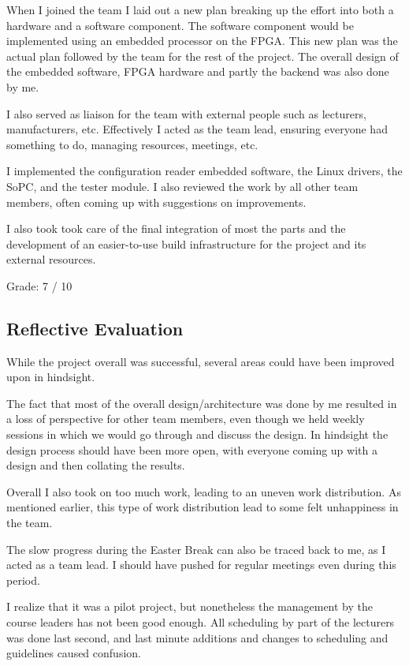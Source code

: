 \documentclass[a4paper,10pt]{article}
\begin{document}
When I joined the team I laid out a new plan breaking up the effort into both
a hardware and a software component. The software component would be implemented
using an embedded processor on the FPGA. This new plan was the actual plan followed
by the team for the rest of the project. The overall design of the embedded software,
FPGA hardware and partly the backend was also done by me.

I also served as liaison for the team with external people such as lecturers,
manufacturers, etc. Effectively I acted as the team lead, ensuring everyone
had something to do, managing resources, meetings, etc.

I implemented the configuration reader embedded software, the Linux drivers, the SoPC,
and the tester module. I also reviewed the work by all other team members,
often coming up with suggestions on improvements.

I also took took care of the final integration of most the parts and the development
of an easier-to-use build infrastructure for the project and its external resources.

Grade: 7 / 10





\subsection{Reflective Evaluation}
While the project overall was successful, several areas could have been improved
upon in hindsight.

The fact that most of the overall design/architecture was done by me resulted
in a loss of perspective for other team members, even though we held weekly sessions
in which we would go through and discuss the design. In hindsight the design
process should have been more open, with everyone coming up with a design and then
collating the results.

Overall I also took on too much work, leading to an uneven work distribution. As
mentioned earlier, this type of work distribution lead to some felt unhappiness in the
team.

The slow progress during the Easter Break can also be traced back to me, as I acted
as a team lead. I should have pushed for regular meetings even during this
period.

I realize that it was
a pilot project, but nonetheless the management by the course leaders has not been good enough. All
scheduling by part of the lecturers was done last second, and last minute additions
and changes to scheduling and guidelines caused confusion.
\end{document}
